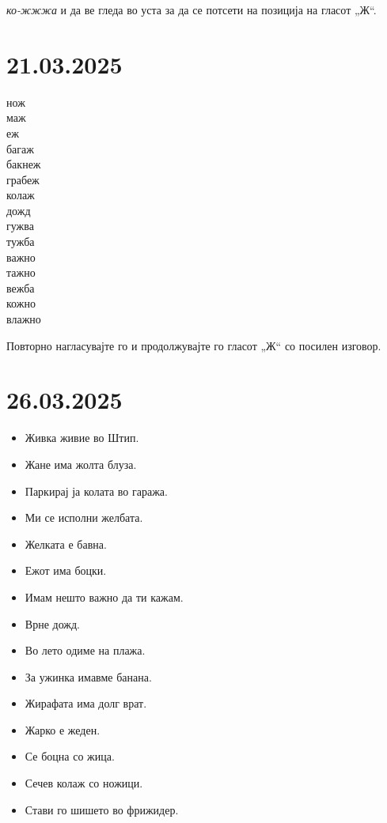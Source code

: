 \documentclass[a5paper,12pt]{article}
\newenvironment{activity}[1]{%
  \begin{tcolorbox}[colback=boxcolor,colframe=titlecolor,title={\textbf{#1}},fonttitle=\bfseries]
}{%
  \end{tcolorbox}
}
\newenvironment{instruction}{%
  \begin{tcolorbox}[colback=white,colframe=accentcolor,title={\textbf{Инструкции}},fonttitle=\bfseries] 
}{%
  \end{tcolorbox}
}
\begin{document}
\begin{instruction}
\emph{ко-жжжа} и да ве гледа во уста за да се потсети на позиција на гласот „Ж“.
\end{instruction}

\section{21.03.2025}
\begin{activity}{Зборчиња}
\begin{multicols}{4}
нож\\ маж\\ еж\\ багаж\\ бакнеж\\ грабеж\\ колаж\\ дожд\\ гужва\\ тужба\\ важно\\ тажно\\ вежба\\ кожно\\ влажно
\end{multicols}
\end{activity}

\begin{instruction}
Повторно нагласувајте го и продолжувајте го гласот „Ж“ со посилен изговор.
\end{instruction}

\section{26.03.2025}
\begin{itemize}
  \item Живка живие во Штип.
  \item Жане има жолта блуза.
  \item Паркирај ја колата во гаража.
  \item Ми се исполни желбата.
  \item Желката е бавна.
  \item Ежот има боцки.
  \item Имам нешто важно да ти кажам.
  \item Врне дожд.
  \item Во лето одиме на плажа.
  \item За ужинка имавме банана.
  \item Жирафата има долг врат.
  \item Жарко е жеден.
  \item Се боцна со жица.
  \item Сечев колаж со ножици.
  \item Стави го шишето во фрижидер.
\end{itemize}
\end{document}
